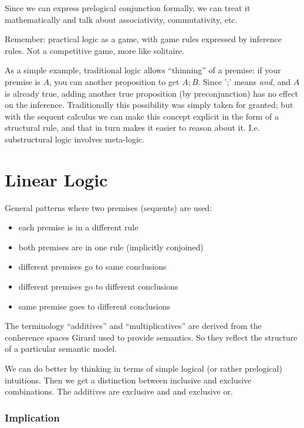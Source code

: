 \documentclass{article}
\begin{document}
Since we can express prelogical conjunction formally, we can treat it
mathematically and talk about associativity, commutativity, etc.

Remember: practical logic as a game, with game rules expressed by inference
rules. Not a competitive game, more like solitaire.

As a simple example, traditional logic allows ``thinning''
of a premise: if your premise is \(A\), you can another proposition to
get \(A; B\). Since ';' means \textit{and}, and \(A\) is already true,
adding another true proposition (by preconjunction) has no effect on
the inference. Traditionally this possibility was simply taken for
granted; but with the sequent calculus we can make this concept
explicit in the form of a structural rule, and that in turn makes it
easier to reason about it.  I.e. substructural logic involves meta-logic.

\section{Linear Logic}

General patterns where two premises (sequents) are used:

\begin{itemize}
\item each premise is in a different rule
\item both premises are in one rule (implicitly conjoined)
\item different premises go to same conclusions
\item different premises go to different conclusions
\item same premise goes to different conclusions
\end{itemize}

The terminology ``additives'' and ``multiplicatives'' are derived from
the conherence spaces Girard used to provide semantics. So they
reflect the structure of a particular semantic model.

We can do better by thinking in terms of simple logical (or rather
prelogical) intuitions. Then we get a distinction between inclusive
and exclusive combinations. The additives are exclusive and and
exclusive or.

\subsubsection{Implication}
\end{document}
